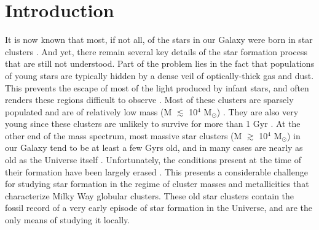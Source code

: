 \section{Introduction} \label{intro6}
It is now known that most, if not all, of the stars in our Galaxy were
born in star clusters \citep[e.g.][]{lada95, lada03, mckee07}.  And yet, 
there remain several key details of the star formation process that are still
not understood.  Part of the 
problem lies in the fact that populations of young stars are typically
hidden by a dense veil of optically-thick gas and dust.  This
prevents the escape of most of the light produced by infant stars, and
often renders these regions difficult to observe \citep[e.g.][]{grenier05,
  lada07}.  Most of 
these clusters are sparsely populated and are of relatively low mass (M
$\lesssim$ 10$^4$ M$_{\odot}$) \citep[e.g.][]{lada85}.  They are also
very young since these clusters are unlikely to survive for more than
1 Gyr \citep[e.g.][]{portegieszwart10}.    
At the other end of the mass spectrum, most massive star clusters (M
$\gtrsim$ 10$^4$ M$_{\odot}$) in our Galaxy tend to be at least a few
Gyrs old, and 
in many cases are nearly as old as the Universe itself
\citep[e.g.][]{harris96, deangeli05}.  %
Unfortunately, the conditions present at the
time of their formation have been largely erased
\citep[e.g.][]{hurley05, murray09}.  This presents a 
considerable challenge for studying star formation in the regime of
cluster masses and metallicities that characterize Milky Way globular 
clusters.  These old star clusters contain the fossil record of a very
early episode of star formation in the Universe, and are the only
means of studying it locally.

